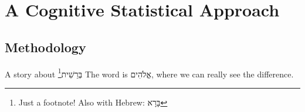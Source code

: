 
\chapter{A Cognitive Statistical Approach}  %



\section{Methodology}

A story about \texthebrew{בְּרֵשִׁית}\footnote{Just a footnote! Also with Hebrew: \texthebrew{בָּרָא}}
The word is \texthebrew{אֱלֹהִים}, where we can really see the difference.

\begin{adjustbox}{width=1\textwidth}

\end{adjustbox}